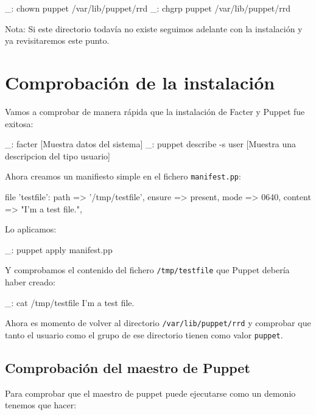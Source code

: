 \begin{bashcode}
_: chown puppet /var/lib/puppet/rrd
_: chgrp puppet /var/lib/puppet/rrd
\end{bashcode}

Nota: Si este directorio todavía no existe seguimos adelante con la instalación y ya revisitaremos este punto.


\section{Comprobación de la instalación}

Vamos a comprobar de manera rápida que la instalación de Facter y Puppet fue exitosa:

\begin{bashcode}
_: facter
[Muestra datos del sistema]
_: puppet describe -s user
[Muestra una descripcion del tipo usuario]
\end{bashcode}

Ahora creamos un manifiesto simple en el fichero \texttt{manifest.pp}:

\begin{rubycode}
file {'testfile':
  path    => '/tmp/testfile',
  ensure  => present,
  mode    => 0640,
  content => "I'm a test file.",
}
\end{rubycode}

Lo aplicamos:

\begin{bashcode}
_: puppet apply manifest.pp
\end{bashcode}

Y comprobamos el contenido del fichero \texttt{/tmp/testfile} que Puppet debería haber creado:

\begin{bashcode}
_: cat /tmp/testfile
I'm a test file.
\end{bashcode}

Ahora es momento de volver al directorio \texttt{/var/lib/puppet/rrd} y comprobar que tanto el usuario como el grupo de ese directorio tienen como valor \texttt{puppet}.


\subsection{Comprobación del maestro de Puppet}

Para comprobar que el maestro de puppet puede ejecutarse como un demonio tenemos que hacer:

